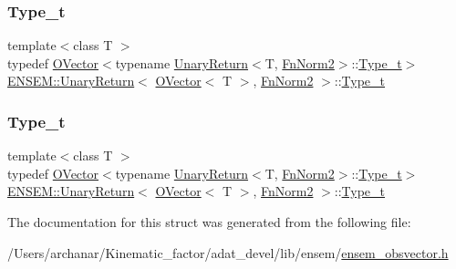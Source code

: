 \subsubsection{\texorpdfstring{Type\_t}{Type\_t}\hspace{0.1cm}{\footnotesize\ttfamily [1/2]}}
{\footnotesize\ttfamily template$<$class T $>$ \\
typedef \mbox{\hyperlink{classENSEM_1_1OVector}{O\+Vector}}$<$typename \mbox{\hyperlink{structENSEM_1_1UnaryReturn}{Unary\+Return}}$<$T, \mbox{\hyperlink{structENSEM_1_1FnNorm2}{Fn\+Norm2}}$>$\+::\mbox{\hyperlink{structENSEM_1_1UnaryReturn_3_01OVector_3_01T_01_4_00_01FnNorm2_01_4_a67bb1e2e118524484dc34c80b8d75046}{Type\+\_\+t}}$>$ \mbox{\hyperlink{structENSEM_1_1UnaryReturn}{E\+N\+S\+E\+M\+::\+Unary\+Return}}$<$ \mbox{\hyperlink{classENSEM_1_1OVector}{O\+Vector}}$<$ T $>$, \mbox{\hyperlink{structENSEM_1_1FnNorm2}{Fn\+Norm2}} $>$\+::\mbox{\hyperlink{structENSEM_1_1UnaryReturn_3_01OVector_3_01T_01_4_00_01FnNorm2_01_4_a67bb1e2e118524484dc34c80b8d75046}{Type\+\_\+t}}}

\mbox{\label{structENSEM_1_1UnaryReturn_3_01OVector_3_01T_01_4_00_01FnNorm2_01_4_a67bb1e2e118524484dc34c80b8d75046}} 
\subsubsection{\texorpdfstring{Type\_t}{Type\_t}\hspace{0.1cm}{\footnotesize\ttfamily [2/2]}}
{\footnotesize\ttfamily template$<$class T $>$ \\
typedef \mbox{\hyperlink{classENSEM_1_1OVector}{O\+Vector}}$<$typename \mbox{\hyperlink{structENSEM_1_1UnaryReturn}{Unary\+Return}}$<$T, \mbox{\hyperlink{structENSEM_1_1FnNorm2}{Fn\+Norm2}}$>$\+::\mbox{\hyperlink{structENSEM_1_1UnaryReturn_3_01OVector_3_01T_01_4_00_01FnNorm2_01_4_a67bb1e2e118524484dc34c80b8d75046}{Type\+\_\+t}}$>$ \mbox{\hyperlink{structENSEM_1_1UnaryReturn}{E\+N\+S\+E\+M\+::\+Unary\+Return}}$<$ \mbox{\hyperlink{classENSEM_1_1OVector}{O\+Vector}}$<$ T $>$, \mbox{\hyperlink{structENSEM_1_1FnNorm2}{Fn\+Norm2}} $>$\+::\mbox{\hyperlink{structENSEM_1_1UnaryReturn_3_01OVector_3_01T_01_4_00_01FnNorm2_01_4_a67bb1e2e118524484dc34c80b8d75046}{Type\+\_\+t}}}



The documentation for this struct was generated from the following file\+:\begin{DoxyCompactItemize}
\item 
/\+Users/archanar/\+Kinematic\+\_\+factor/adat\+\_\+devel/lib/ensem/\mbox{\hyperlink{lib_2ensem_2ensem__obsvector_8h}{ensem\+\_\+obsvector.\+h}}\end{DoxyCompactItemize}
